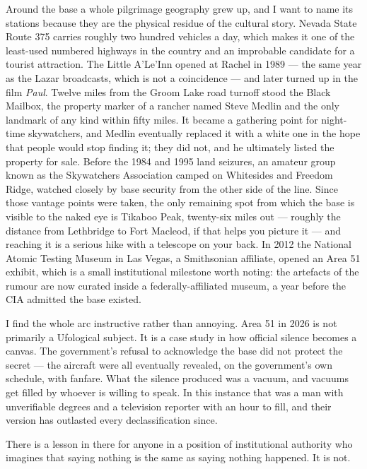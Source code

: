 Around the base a whole pilgrimage geography grew up, and I want to name its stations because
they are the physical residue of the cultural story. Nevada State Route 375 carries roughly two
hundred vehicles a day, which makes it one of the least-used numbered highways in the country and
an improbable candidate for a tourist attraction. The Little A'Le'Inn opened at Rachel in 1989 ---
the same year as the Lazar broadcasts, which is not a coincidence --- and later turned up in the
film \emph{Paul}. Twelve miles from the Groom Lake road turnoff stood the Black Mailbox, the
property marker of a rancher named Steve Medlin and the only landmark of any kind within fifty
miles. It became a gathering point for night-time skywatchers, and Medlin eventually replaced it
with a white one in the hope that people would stop finding it; they did not, and he ultimately
listed the property for sale. Before the 1984 and 1995 land seizures, an amateur group known as the
Skywatchers Association camped on Whitesides and Freedom Ridge, watched closely by base security
from the other side of the line. Since those vantage points were taken, the only remaining spot from
which the base is visible to the naked eye is Tikaboo Peak, twenty-six miles out --- roughly the
distance from Lethbridge to Fort Macleod, if that helps you picture it --- and reaching it is a
serious hike with a telescope on your back. In 2012 the National Atomic Testing Museum in Las Vegas,
a Smithsonian affiliate, opened an Area 51 exhibit, which is a small institutional milestone worth
noting: the artefacts of the rumour are now curated inside a federally-affiliated museum, a year
before the CIA admitted the base existed.

I find the whole arc instructive rather than annoying. Area 51 in 2026 is not primarily a
Ufological subject. It is a case study in how official silence becomes a canvas. The
government's refusal to acknowledge the base did not protect the secret --- the aircraft
were all eventually revealed, on the government's own schedule, with fanfare. What the
silence produced was a vacuum, and vacuums get filled by whoever is willing to speak. In
this instance that was a man with unverifiable degrees and a television reporter with an
hour to fill, and their version has outlasted every declassification since.

There is a lesson in there for anyone in a position of institutional authority who
imagines that saying nothing is the same as saying nothing happened. It is not. 

